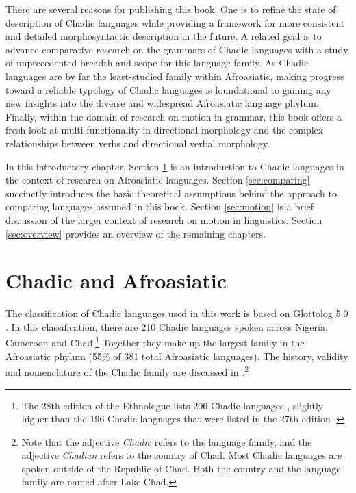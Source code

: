 There are several reasons for publishing this book. One is to refine the state of description of Chadic languages while providing a framework for more consistent and detailed morphosyntactic description in the future. A related goal is to advance comparative research on the grammars of Chadic languages with a study of unprecedented breadth and scope for this language family. As Chadic languages are by far the least-studied family within Afroasiatic, making progress toward a reliable typology of Chadic languages is foundational to gaining any new insights into the diverse and widespread Afroasiatic language phylum. Finally, within the domain of research on motion in grammar, this book offers a fresh look at multi-functionality in directional morphology and the complex relationships between verbs and directional verbal morphology.  

In this introductory chapter, Section \ref{sec:Chadic} is an introduction to Chadic languages in the context of research on Afroasiatic languages. Section \ref{sec:comparing} succinctly introduces the basic theoretical assumptions behind the approach to comparing languages assumed in this book. Section \ref{sec:motion} is a brief discussion of the larger context of research on motion in linguistics. Section \ref{sec:overview} provides an overview of the remaining chapters. 

\section{Chadic and Afroasiatic} \label{sec:Chadic}

The classification of Chadic languages used in this work is based on Glottolog 5.0 \citep{hammarstromGlottolog502024}. In this classification, there are 210 Chadic languages spoken across Nigeria, Cameroon and Chad.\footnote{The 28th edition of the Ethnologue lists 206 Chadic languages \citep{eberhardEthnologueLanguagesWorld2025}, slightly higher than the 196 Chadic languages that were listed in the 27th edition \citep{eberhardEthnologueLanguagesWorld2024}.} Together they make up the largest family in the Afroasiatic phylum (55\% of 381 total Afroasiatic languages). The history, validity and nomenclature of the Chadic family are discussed in \citet{porkhomovskyAfroAsiaticOverview2020}.\footnote{Note that the adjective \textit{Chadic} refers to the language family, and the adjective \textit{Chadian} refers to the country of Chad. Most Chadic languages are spoken outside of the Republic of Chad. Both the country and the language family are named after Lake Chad.}  

